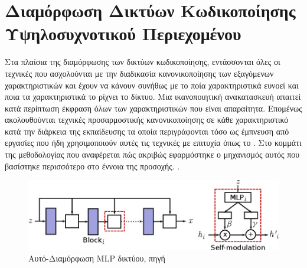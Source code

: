 \section{Διαμόρφωση Δικτύων Κωδικοποίησης Υψηλοσυχνοτικού Περιεχομένου}
\label{section:featureModulation}

Στα πλαίσια της διαμόρφωσης των δικτύων κωδικοποίησης, εντάσσονται όλες οι τεχνικές που ασχολούνται με την διαδικασία κανονικοποίησης των εξαγόμενων χαρακτηριστικών και έχουν να κάνουν συνήθως με το ποία χαρακτηριστικά ευνοεί και ποια τα χαρακτηριστικά το ρίχνει το δίκτυο. Μια ικανοποιητική ανακατασκευή απαιτεί κατά περίπτωση έκφραση όλων των χαρακτηριστικών που είναι απαραίτητα. Επομένως ακολουθούνται τεχνικές προσαρμοστικής κανονικοποίησης σε κάθε χαρακτηριστικό κατά την διάρκεια της εκπαίδευσης τα οποία περιγράφονται τόσο ως έμπνευση από εργασίες που ήδη χρησιμοποιούν αυτές τις τεχνικές με επιτυχία όπως το  \cite{karras2020analyzing}. Στο κομμάτι της μεθοδολογίας που αναφέρεται πώς ακριβώς εφαρμόστηκε ο μηχανισμός αυτός που βασίστηκε περισσότερο στο έννοια της προσοχής. \cite{vaswani2023attention}.

\begin{figure}[H]
    \centering
    \includegraphics[width=0.4\linewidth]{images/chapter2_img/self-modulationMLPS.jpg}
    \caption{Αυτό-Διαμόρφωση MLP δικτύου, πηγή \cite{Chen2018OnSM}}
    \label{fig:selfmod}
\end{figure}